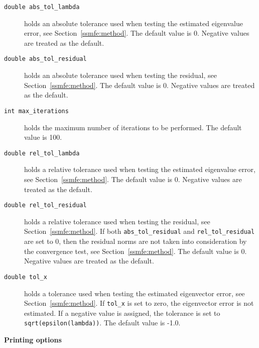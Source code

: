 \begin{description}
%
\item[\texttt{double abs\_tol\_lambda}]
holds an absolute tolerance used when testing the estimated eigenvalue 
error, see Section~\ref{ssmfe:method}. 
The default value is 0.
Negative values are treated as the default.
%
\item[\texttt{double abs\_tol\_residual}]
holds an absolute tolerance used when testing the residual, 
see Section~\ref{ssmfe:method}.
The default value is 0.
Negative values are treated as the default.
%
\item[\texttt{int max\_iterations}]
holds the maximum number of iterations to be performed.
The default value is 100.
%
\item[\texttt{double rel\_tol\_lambda}]
holds a relative tolerance used when testing the estimated eigenvalue 
error, see Section~\ref{ssmfe:method}. 
The default value is 0. 
Negative values are treated as the default.
%
\item[\texttt{double rel\_tol\_residual}]
holds a relative tolerance used when testing the residual,
see Section~\ref{ssmfe:method}. 
If both {\tt abs\_tol\_residual} and {\tt rel\_tol\_residual}
are set to 0, then the residual norms are not taken
into consideration by the convergence test,
see Section~\ref{ssmfe:method}.
The default value is 0.
Negative values are treated as the default.
%
\item[\texttt{double tol\_x}]
holds a tolerance used when testing the estimated 
eigenvector error, see Section~\ref{ssmfe:method}. 
If {\tt tol\_x} is set to zero, the eigenvector error is not estimated.
If a negative value is assigned, the tolerance is set to
{\tt sqrt(epsilon(lambda))}.
The default value is -1.0.
%
\end{description}

\medskip
\noindent
{\bf Printing options}

